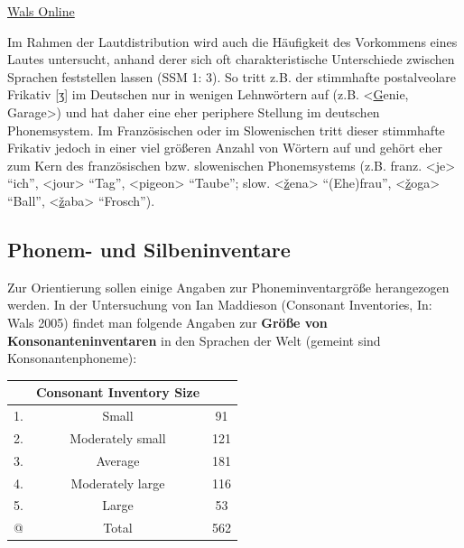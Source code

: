 \documentclass[
  letterpaper,
]{scrbook}
\begin{document}
\href{https://wals.info/}{Wals Online}

Im Rahmen der Lautdistribution wird auch die Häufigkeit des Vorkommens
eines Lautes untersucht, anhand derer sich oft charakteristische
Unterschiede zwischen Sprachen feststellen lassen (SSM 1: 3). So tritt
z.B. der stimmhafte postalveolare Frikativ {[}ʒ{]} im Deutschen nur in
wenigen Lehnwörtern auf (z.B. \textless{}\uline{G}enie,
Gara\uline{g}e\textgreater) und hat daher eine eher periphere Stellung
im deutschen Phonemsystem. Im Französischen oder im Slowenischen tritt
dieser stimmhafte Frikativ jedoch in einer viel größeren Anzahl von
Wörtern auf und gehört eher zum Kern des französischen bzw. slowenischen
Phonemsystems (z.B. franz. \textless{}\uline{j}e\textgreater{} ``ich'',
\textless{}\uline{j}our\textgreater{} ``Tag'',
\textless pi\uline{g}eon\textgreater{} ``Taube''; slow.
\textless{}\uline{ž}ena\textgreater{} ``(Ehe)frau'',
\textless{}\uline{ž}oga\textgreater{} ``Ball'',
\textless{}\uline{ž}aba\textgreater{} ``Frosch'').

\hypertarget{phonem--und-silbeninventare}{%
\subsection{Phonem- und
Silbeninventare}\label{phonem--und-silbeninventare}}

Zur Orientierung sollen einige Angaben zur Phoneminventargröße
herangezogen werden. In der Untersuchung von Ian Maddieson (Consonant
Inventories, In: Wals 2005) findet man folgende Angaben zur
\textbf{Größe von Konsonanteninventaren} in den Sprachen der Welt
(gemeint sind Konsonantenphoneme):

\begin{longtable}[]{@{}ccc@{}}
\toprule()
~ & \textbf{Consonant Inventory Size} & ~ \\
\midrule()
\endhead
1. & Small & 91 \\
2. & Moderately small & 121 \\
3. & Average & 181 \\
4. & Moderately large & 116 \\
5. & Large & 53 \\
@ & Total & 562 \\
\bottomrule()
\end{longtable}

~
\end{document}
